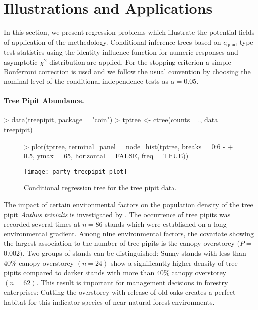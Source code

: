 \documentclass[letter]{article}
\begin{document}
\section{Illustrations and Applications \label{illustrations}}

In this section, we present regression problems which illustrate the
potential fields of application of the methodology.  
Conditional inference trees based on $c_\text{quad}$-type test statistics 
using the identity influence function for numeric responses 
and asymptotic $\chi^2$ distribution are applied.
For the stopping criterion a simple
Bonferroni correction is used and we follow the usual convention by choosing
the nominal level of the conditional independence tests as $\alpha = 0.05$.

\paragraph{Tree Pipit Abundance.}

\begin{Schunk}
\begin{Sinput}
> data(treepipit, package = "coin")
> tptree <- ctree(counts ~ ., data = treepipit)
\end{Sinput}
\end{Schunk}

\begin{figure}[t]
\begin{center}
\begin{Schunk}
\begin{Sinput}
> plot(tptree, terminal_panel = node_hist(tptree, breaks = 0:6 - 
+     0.5, ymax = 65, horizontal = FALSE, freq = TRUE))
\end{Sinput}
\end{Schunk}
\texttt{[image: party-treepipit-plot]}
\caption{Conditional regression tree for the tree pipit data.}
\end{center}
\end{figure}


The impact of certain environmental factors on the population density of the 
tree pipit \textit{Anthus trivialis} 
is investigated by \cite{MuellerHothorn2004}.
The occurrence of tree pipits was recorded several times at
$n = 86$ stands which were established on a long environmental gradient. 
Among nine environmental factors, 
the covariate showing the largest association to the number of tree pipits
is the canopy overstorey $(P = $0.002$)$. 
Two groups of stands can be distinguished: Sunny stands with less than $40\%$
canopy overstorey $(n = 24)$ show a
significantly higher density of tree pipits compared to darker stands with more than
$40\%$ canopy overstorey $(n = 62)$.
This result is important for management decisions
in forestry enterprises: Cutting the overstorey with release of old
oaks creates a perfect habitat for this indicator species
of near natural forest environments. 
\end{document}
